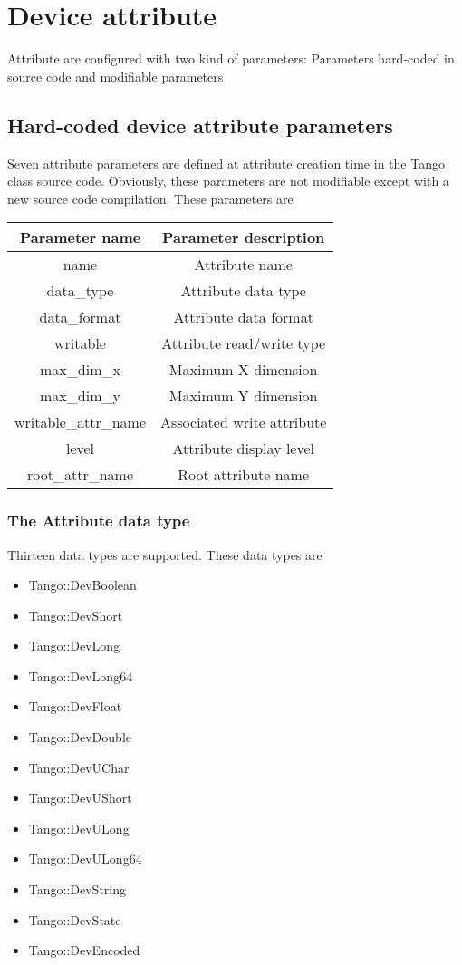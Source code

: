 \section{Device attribute}

Attribute are configured with two kind of parameters: Parameters hard-coded
in source code and modifiable parameters


\subsection{Hard-coded device attribute parameters}

Seven attribute parameters are defined at attribute
creation time in the Tango class source code. Obviously, these parameters
are not modifiable except with a new source code compilation. These
parameters are 

\vspace{0.3cm}


\begin{center}
\begin{longtable}{|c|c|}
\hline 
Parameter name & Parameter description\tabularnewline
\hline 
\hline 
name & Attribute name\tabularnewline
\hline 
data\_type & Attribute data type\tabularnewline
\hline 
data\_format & Attribute data format\tabularnewline
\hline 
writable\index{writable} & Attribute read/write type\tabularnewline
\hline 
max\_dim\_x & Maximum X dimension\tabularnewline
\hline 
max\_dim\_y & Maximum Y dimension\tabularnewline
\hline 
writable\_attr\_name\index{writable-attr-name} & Associated write attribute\tabularnewline
\hline 
level\index{level} & Attribute display level\tabularnewline
\hline 
root\_attr\_name & Root attribute name\tabularnewline
\hline 
\end{longtable}
\par\end{center}

\vspace{0.3cm}



\subsubsection{The Attribute data type}

Thirteen data types are supported. These data types are
\begin{itemize}
\item Tango::DevBoolean 
\item Tango::DevShort
\item Tango::DevLong
\item Tango::DevLong64
\item Tango::DevFloat
\item Tango::DevDouble
\item Tango::DevUChar
\item Tango::DevUShort
\item Tango::DevULong
\item Tango::DevULong64
\item Tango::DevString
\item Tango::DevState
\item Tango::DevEncoded
\end{itemize}

